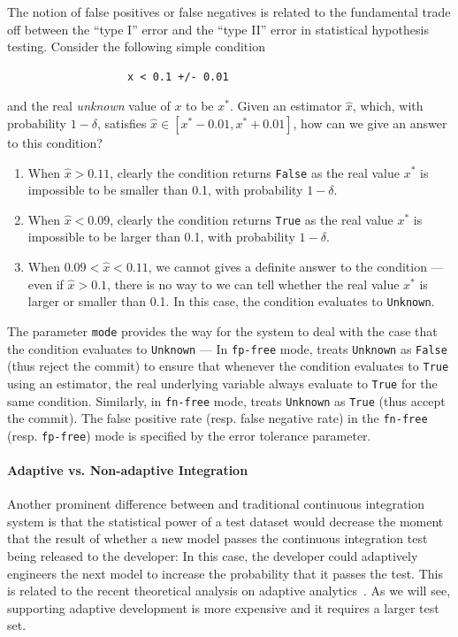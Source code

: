 \documentclass{article}
\begin{document}
The notion of false positives or false negatives
is related to the fundamental trade off between
the ``type I'' error and the ``type II'' error
in statistical hypothesis testing.
Consider the following simple condition
\begin{verbatim}
                   x < 0.1 +/- 0.01
\end{verbatim}
and the real {\em unknown} value of $x$ to be
$x^*$. Given an estimator $\hat{x}$, which,
with probability $1-\delta$, satisfies
$\hat{x} \in [x^* - 0.01, x^* + 0.01]$, how can we 
give an answer to this condition?
\begin{enumerate}
\item When $\hat{x} > 0.11$, clearly the condition
returns \texttt{False} as the real value $x^*$
is impossible to be smaller than 0.1, with 
probability $1-\delta$.
\item When $\hat{x} < 0.09$, clearly the condition
returns \texttt{True} as the real value $x^*$
is impossible to be larger than 0.1, with 
probability $1-\delta$.
\item When $0.09 < \hat{x} < 0.11$, we cannot 
gives a definite answer to the condition --- even if
$\hat{x} > 0.1$, there is no way to we can tell
whether the real value $x^*$ is larger or smaller
than 0.1. In this case, the condition evaluates to
\texttt{Unknown}.
\end{enumerate}

The parameter \texttt{mode} provides the way for
the system to deal with the case that the condition
evaluates to \texttt{Unknown} --- In
\texttt{fp-free} mode, \sys treats \texttt{Unknown}
as \texttt{False} (thus reject the commit) to ensure
that whenever the condition evaluates to \texttt{True}
using an estimator, the real underlying variable 
always evaluate to \texttt{True} for the same condition. 
Similarly, in \texttt{fn-free} mode, 
\sys treats \texttt{Unknown}
as \texttt{True} (thus accept the commit).
The false positive rate (resp. false negative rate)
in the \texttt{fn-free} (resp. \texttt{fp-free})
mode is specified by the error tolerance parameter.

\paragraph*{Adaptive vs. Non-adaptive Integration}
Another prominent difference between \sys and 
traditional continuous integration system is that 
the statistical power of a test dataset would decrease
the moment that the result of whether a new model
passes the continuous integration test being released
to the developer: In this case, the developer could
adaptively engineers the next model to increase the
probability that it passes the test. This
is related to the recent theoretical 
analysis on adaptive analytics~\cite{XXX,XXX}.
As we will see, supporting adaptive development
is more expensive and it requires a larger test set.
\end{document}
